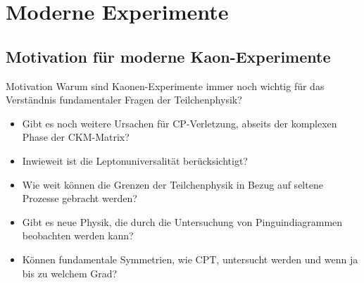\documentclass[aspectratio=1610, professionalfonts, 9pt, t]{beamer}
\begin{document}
  \section{Moderne Experimente}

  \subsection{Motivation für moderne Kaon-Experimente}


  \begin{frame}{Motivation}
    Warum sind Kaonen-Experimente immer noch wichtig für das Verständnis fundamentaler Fragen der Teilchenphysik?
    \begin{itemize}
      \item Gibt es noch weitere Ursachen für CP-Verletzung, abseits der komplexen Phase der CKM-Matrix?
      \item Inwieweit ist die Leptonuniversalität berücksichtigt?
      \item Wie weit können die Grenzen der Teilchenphysik in Bezug auf seltene Prozesse gebracht werden?
      \item Gibt es neue Physik, die durch die Untersuchung von Pinguindiagrammen beobachten werden kann?
      \item Können fundamentale Symmetrien, wie CPT, untersucht werden und wenn ja bis zu welchem Grad?
    \end{itemize}
  \end{frame}
\end{document}
